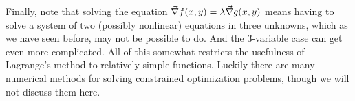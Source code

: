 Finally, note that solving the equation $\vec\nabla f(x,y) = \lambda \vec\nabla g(x,y)$ means having to solve a system of two (possibly nonlinear) equations in three unknowns, which as we have seen before, may not be possible to do. And the 3-variable case can get even more complicated. All of this somewhat restricts the usefulness of Lagrange's method to relatively simple functions. Luckily there are many numerical methods for solving constrained optimization problems, though we will not discuss them here.

